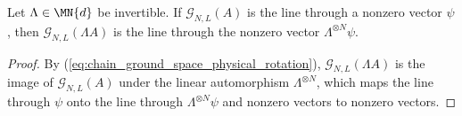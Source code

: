 \begin{lemma}\label{thm:unique_ground_state_physical_rotation}
    \leanok
    Let $\Lambda\in\MN{d}$ be invertible. If $\mathcal G_{N,L}(A)$ is the
    line through a nonzero vector $\psi$, then $\mathcal G_{N,L}(\Lambda A)$
    is the line through the nonzero vector $\Lambda^{\otimes N}\psi$.
\end{lemma}

\begin{proof}
    \leanok
    By (\ref{eq:chain_ground_space_physical_rotation}), $\mathcal G_{N,L}(\Lambda A)$
    is the image of $\mathcal G_{N,L}(A)$ under the linear automorphism
    $\Lambda^{\otimes N}$, which maps the line through $\psi$ onto the line
    through $\Lambda^{\otimes N}\psi$ and nonzero vectors to nonzero vectors.
\end{proof}
